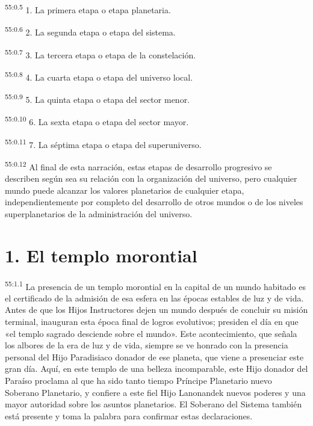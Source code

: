 \par
\textsuperscript{55:0.5} 1. La primera etapa o etapa planetaria.

\par
\textsuperscript{55:0.6} 2. La segunda etapa o etapa del sistema.

\par
\textsuperscript{55:0.7} 3. La tercera etapa o etapa de la constelación.

\par
\textsuperscript{55:0.8} 4. La cuarta etapa o etapa del universo local.

\par
\textsuperscript{55:0.9} 5. La quinta etapa o etapa del sector menor.

\par
\textsuperscript{55:0.10} 6. La sexta etapa o etapa del sector mayor.

\par
\textsuperscript{55:0.11} 7. La séptima etapa o etapa del superuniverso.

\par
\textsuperscript{55:0.12} Al final de esta narración, estas etapas de desarrollo progresivo se describen según sea su relación con la organización del universo, pero cualquier mundo puede alcanzar los valores planetarios de cualquier etapa, independientemente por completo del desarrollo de otros mundos o de los niveles superplanetarios de la administración del universo.

\section*{1. El templo morontial}
\par
\textsuperscript{55:1.1} La presencia de un templo morontial en la capital de un mundo habitado es el certificado de la admisión de esa esfera en las épocas estables de luz y de vida. Antes de que los Hijos Instructores dejen un mundo después de concluir su misión terminal, inauguran esta época final de logros evolutivos; presiden el día en que «el templo sagrado desciende sobre el mundo». Este acontecimiento, que señala los albores de la era de luz y de vida, siempre se ve honrado con la presencia personal del Hijo Paradisiaco donador de ese planeta, que viene a presenciar este gran día. Aquí, en este templo de una belleza incomparable, este Hijo donador del Paraíso proclama al que ha sido tanto tiempo Príncipe Planetario nuevo Soberano Planetario, y confiere a este fiel Hijo Lanonandek nuevos poderes y una mayor autoridad sobre los asuntos planetarios. El Soberano del Sistema también está presente y toma la palabra para confirmar estas declaraciones.


